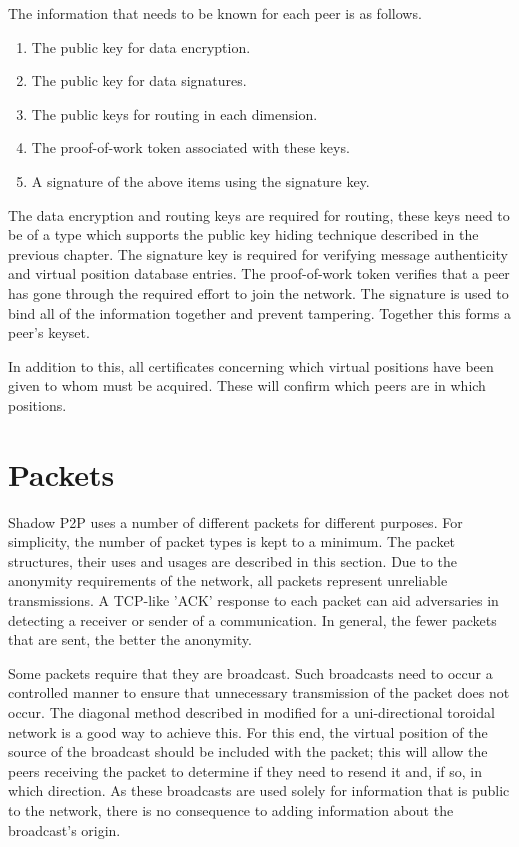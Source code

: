 \documentclass[ %
                    author={Luke Murray},
                supervisor={Dr. Simon Hollis},
                     title={Shadow Peer-to-Peer Networks},
                  subtitle={},
                    degree={MEng},
                      year={2013} ]{thesis}
\begin{document}
The information that needs to be known for each peer is as follows.
\begin{enumerate}
\item The public key for data encryption.
\item The public key for data signatures.
\item The public keys for routing in each dimension.
\item The proof-of-work token associated with these keys.
\item A signature of the above items using the signature key.
\end{enumerate}
The data encryption and routing keys are required for routing, these keys need to be of a type which supports the public key hiding technique described in the previous chapter. The signature key is required for verifying message authenticity and virtual position database entries. The proof-of-work token verifies that a peer has gone through the required effort to join the network. The signature is used to bind all of the information together and prevent tampering. Together this forms a peer's keyset.

In addition to this, all certificates concerning which virtual positions have been given to whom must be acquired. These will confirm which peers are in which positions.

\section{Packets}

Shadow P2P uses a number of different packets for different purposes. For simplicity, the number of packet types is kept to a minimum. The packet structures, their uses and usages are described in this section. Due to the anonymity requirements of the network, all packets represent unreliable transmissions. A TCP-like 'ACK' response to each packet can aid adversaries in detecting a receiver or sender of a communication. In general, the fewer packets that are sent, the better the anonymity.

Some packets require that they are broadcast. Such broadcasts need to occur a controlled manner to ensure that unnecessary transmission of the packet does not occur. The diagonal method described in \cite{218454} modified for a uni-directional toroidal network is a good way to achieve this. For this end, the virtual position of the source of the broadcast should be included with the packet; this will allow the peers receiving the packet to determine if they need to resend it and, if so, in which direction. As these broadcasts are used solely for information that is public to the network, there is no consequence to adding information about the broadcast's origin. 
\end{document}
